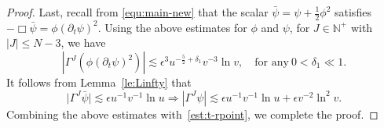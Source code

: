 \documentclass[10pt,a4paper]{amsart}
\def \pt{\partial_{t}}
\begin{document}
\begin{proof}
\smallskip
Last, recall from \eqref{equ:main-new} that the scalar $\bar{\psi} = \psi + \frac{1}{2}\phi^2$ satisfies $-\Box \bar{\psi}=\phi(\pt \psi)^{2}$.
Using the above estimates for $\phi$ and $\psi$, for $J\in \mathbb{N}^{+}$ with $|J|\le N-3$, we have 
\begin{equation*}
   \left|  \Gamma^{J}\left(\phi(\pt \psi)^{2}\right)\right|\lesssim
   \epsilon^3 u^{-\frac{5}{2}+\delta_1}v^{-3}\ln v,\quad \mbox{for any}\ 0<\delta_{1}\ll 1.
\end{equation*}
It follows from Lemma~\ref{le:Linfty} that 
\begin{equation*}
    \big| \Gamma^{J}\bar{\psi}\big|\lesssim \epsilon u^{-1}v^{-1}\ln u\Longrightarrow 
    \left|\Gamma^{J}\psi\right|
\lesssim \epsilon u^{-1}v^{-1}\ln u + \epsilon v^{-2}\ln^{2} v.
\end{equation*}
Combining the above estimates with~\eqref{est:t-rpoint}, we complete the proof.
\end{proof}
\end{document}
